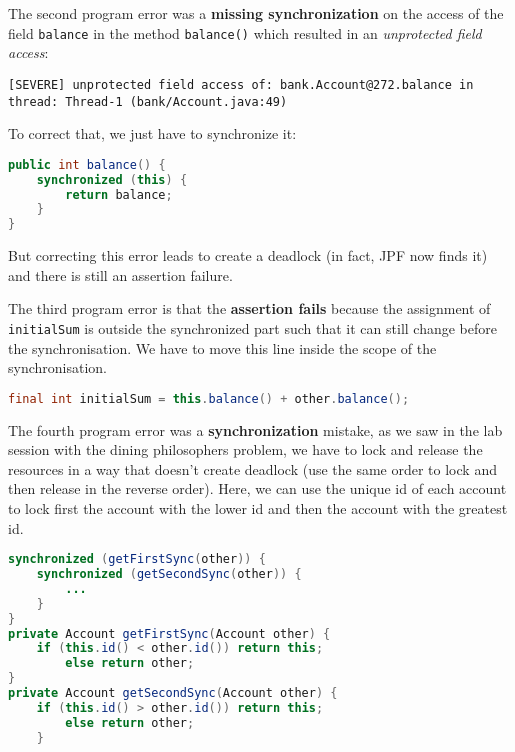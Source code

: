 \documentclass[11pt, a4paper]{article}
\begin{document}
    The second program error was a \textbf{missing synchronization} on the access of the
    field \verb#balance# in the method \verb#balance()# which resulted in an
    \textit{unprotected field access}:

    \begin{scriptsize}
    \begin{verbatim}
[SEVERE] unprotected field access of: bank.Account@272.balance in thread: Thread-1 (bank/Account.java:49)
    \end{verbatim}
    \end{scriptsize}

    To correct that, we just have to synchronize it:

    \begin{lstlisting}[language=Java]
public int balance() {
    synchronized (this) {
        return balance;
    }
}
    \end{lstlisting}

    But correcting this error leads to create a deadlock (in fact, JPF now
    finds it) and there is still an assertion failure. \newline

    The third program error is that the \textbf{assertion fails} because the assignment
    of \verb#initialSum# is outside the synchronized part such that it can still
    change before the synchronisation. We have to move this line inside the scope
    of the synchronisation. \newline

    \begin{lstlisting}[language=Java]
final int initialSum = this.balance() + other.balance();
    \end{lstlisting}

    The fourth program error was a \textbf{synchronization} mistake, as we saw
    in the lab session with the dining philosophers problem, we have to lock
    and release the resources in a way that doesn't create deadlock (use the
    same order to lock and then release in the reverse order). Here, we can
    use the unique id of each account to lock first the account with the lower
    id and then the account with the greatest id. \newline

    \begin{lstlisting}[language=Java]
synchronized (getFirstSync(other)) {
    synchronized (getSecondSync(other)) {
        ...
    }
}
private Account getFirstSync(Account other) {
    if (this.id() < other.id()) return this;
        else return other;
}
private Account getSecondSync(Account other) {
    if (this.id() > other.id()) return this;
        else return other;
    }
    \end{lstlisting}
\end{document}
